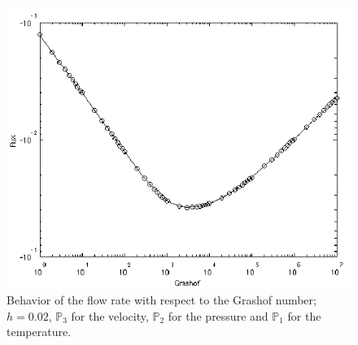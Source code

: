 \begin{figure}[htbp]
  \centering
  \includegraphics[width=.8\linewidth]{pngs/debit_grashof}
  \caption{Behavior of the flow rate with respect to the Grashof number; $h = 0.02$,
    $\mathbb{P}_3$ for the velocity, $\mathbb{P}_2$ for the pressure and
    $\mathbb{P}_1$ for the temperature.}
  \label{fig:4}
\end{figure}




